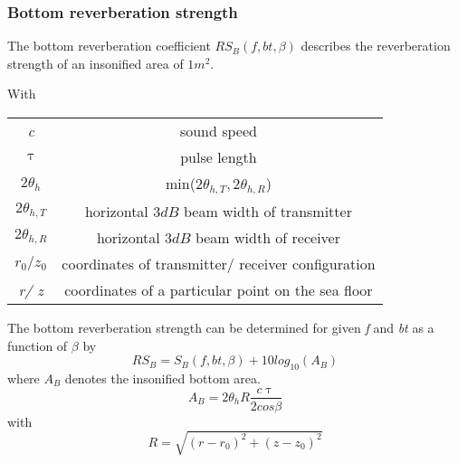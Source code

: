 \subsubsection{ Bottom reverberation strength } \label{ Bottom reverberation strength }
\noindent The bottom reverberation coefficient \textit{$RS_{B}(f,bt,\beta)$} describes the reverberation strength of an insonified area of $1 m^2.$

\noindent With 
\begin{center}
\begin{tabular}{ |c|c| } 
 \hline
  \textit{c} & sound speed  \\ 
  $\uptau$ & pulse length \\ 
  $2 \theta_{h}$  & min($2\theta_{h,T}, 2\theta_{h,R}$)  \\ 
  $2\theta_{h,T}$ &  horizontal $3 dB$ beam width of transmitter \\
  $2\theta_{h,R}$  & horizontal $3 dB$ beam width of receiver \\ 
  \textit{$r_0/ z_0$} & coordinates of transmitter/ receiver configuration \\
  \textit{r/ z} & coordinates of a particular point on the sea floor\\
  \hline
\end{tabular}
\end{center}

\noindent The bottom reverberation strength can be determined for given \textit{f} and \textit{bt} as a function of $\beta$ by
\begin{equation}
\textit{$RS_B$} = \textit{$S_{B}(f,bt,\beta)$} + 10 log_{10}{(A_B)}
\end{equation}
\noindent where \textit{$A_B$} denotes the insonified bottom area.
\begin{equation}
\textit{$A_B$} = 2 \theta_{h} R \frac{ c \uptau }{ 2 cos{\beta}}
\end{equation}
\noindent with
\begin{equation}
\textit{R} = \sqrt{ (\textit{r} - \textit{$r_{0}$})^{2} + (\textit{z} - \textit{$z_{0}$})^{2} }
\end{equation}

